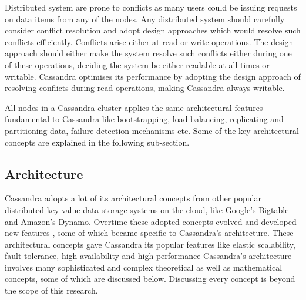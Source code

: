 Distributed system are prone to conflicts as many users could be issuing
requests on data items from any of the nodes. Any distributed system should
carefully consider conflict resolution and adopt design approaches which would
resolve such conflicts efficiently. Conflicts arise either at read or write operations.
The design approach should either make the system resolve such conflicts either
during one of these operations, deciding the system be either readable at all
times or writable. Cassandra optimises its performance by adopting the design
approach of resolving conflicts during read operations, making Cassandra always
writable.

All nodes in a Cassandra cluster applies the same architectural features
fundamental to Cassandra like bootstrapping, load balancing, replicating and partitioning data,
failure detection mechanisms etc. Some of the key architectural concepts are
explained in the following sub-section.



\subsection{Architecture} \label{ss:Cassandra-architecture}

Cassandra adopts a lot of its architectural concepts from other popular
distributed key-value data storage systems on the cloud, like Google's Bigtable
and Amazon's Dynamo. Overtime these adopted concepts evolved and developed new
features , some of which became specific to Cassandra's architecture. These
architectural concepts gave Cassandra its popular features like elastic
scalability, fault tolerance, high availability and high performance Cassandra's
architecture involves many sophisticated and complex theoretical as well as
mathematical concepts, some of which are discussed below. Discussing every
concept is beyond the scope of this research.




